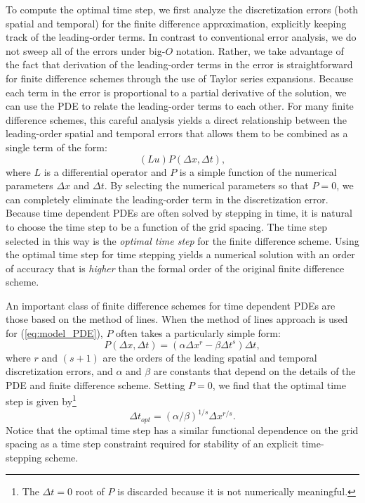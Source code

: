 \documentclass[fleqn,12pt,twoside]{article}
\newcommand{\beq}{\begin{equation}}
\newcommand{\eeq}{\end{equation}}
\def\dt{\Delta t}
\def\dx{\Delta x}
\def\dto{\dt_{opt}}
\begin{document}
To compute the optimal time step, we first analyze the discretization errors 
(both spatial and temporal) for the finite difference approximation, 
explicitly keeping track of the leading-order terms.  In contrast to 
conventional error analysis, we do not sweep all of the errors under big-$O$
notation.  Rather, we take advantage of the fact that derivation of the 
leading-order terms in the error is straightforward for finite difference
schemes through the use of Taylor series expansions.  Because each term in 
the error is proportional to a partial derivative of the solution, we can 
use the PDE to relate the leading-order terms to each other.  
For many finite difference schemes, this careful analysis yields a direct 
relationship between the leading-order spatial and temporal errors that allows 
them to be combined as a single term of the form:
\beq
  (L u) P(\dx, \dt) ,
  \label{eq:leading_order_error_model_PDE_general}
\eeq
where $L$ is a differential operator and $P$ is a simple function of the 
numerical parameters $\dx$ and $\dt$.  By selecting the numerical parameters 
so that $P = 0$, we can completely eliminate the leading-order term in the 
discretization error.  Because time dependent PDEs are often solved by 
stepping in time, it is natural to choose the time step to be a function of 
the grid spacing.  The time step selected in this way is the
\emph{optimal time step} for the finite difference scheme.  Using the optimal
time step for time stepping yields a numerical solution with an order 
of accuracy that is \emph{higher} than the formal order of the original finite 
difference scheme.

An important class of finite difference schemes for time dependent PDEs are 
those based on the method of lines.   When the method of lines approach is 
used for (\ref{eq:model_PDE}), $P$ often takes a particularly simple 
form:
\beq
  P(\dx, \dt) = (\alpha \dx^r - \beta \dt^s) \dt,
  \label{eq:leading_order_error_model_PDE_MOL}
\eeq
where $r$ and $(s+1)$ are the orders of the leading spatial and temporal 
discretization errors, and $\alpha$ and $\beta$ are constants that 
depend on the details of the PDE and finite difference scheme.  Setting 
$P = 0$, we find that the optimal time step is given by\footnote{The $\dt = 0$ 
root of $P$ is discarded because it is not numerically meaningful.}
\beq
  \dto = \left(\alpha/\beta \right)^{1/s} \dx^{r/s}.
  \label{eq:optimal_time_step}
\eeq
Notice that the optimal time step has a similar functional dependence on the 
grid spacing as a time step constraint required for stability of an explicit
time-stepping scheme.
\end{document}
